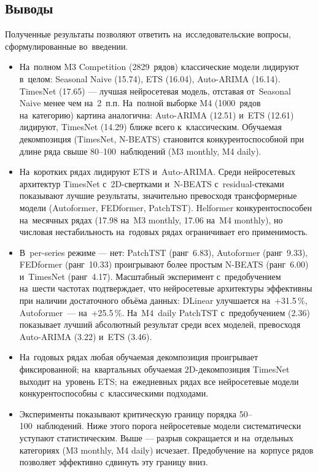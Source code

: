 \subsection{Выводы}
\label{subsec:discussion}

Полученные результаты позволяют ответить на~исследовательские
вопросы, сформулированные во~введении.

\begin{itemize}[nosep]
\item На~полном M3 Competition (2829~рядов) классические модели
лидируют в~целом: Seasonal Naive (15.74), ETS (16.04), Auto-ARIMA (16.14).
TimesNet (17.65) --- лучшая нейросетевая модель, отставая от~Seasonal Naive
менее чем на~2~п.п. На~полной выборке M4 (1000~рядов на~категорию)
картина аналогична: Auto-ARIMA (12.51) и~ETS (12.61) лидируют,
TimesNet (14.29) ближе всего к~классическим.
Обучаемая декомпозиция (TimesNet, N-BEATS) становится конкурентоспособной
при длине ряда свыше 80--100~наблюдений (M3 monthly, M4 daily).

\item На~коротких рядах лидируют ETS и~Auto-ARIMA.
Среди нейросетевых архитектур TimesNet с~2D-свертками
и~N-BEATS с~residual-стеками показывают лучшие результаты,
значительно превосходя трансформерные модели (Autoformer, FEDformer,
PatchTST). Helformer конкурентоспособен на~месячных рядах
(17.98 на~M3 monthly, 17.06 на~M4 monthly), но числовая нестабильность
на~годовых рядах ограничивает его применимость.

\item В~per-series режиме --- нет: PatchTST (ранг~6.83), Autoformer (ранг~9.33),
FEDformer (ранг~10.33) проигрывают более простым N-BEATS (ранг~6.00)
и~TimesNet (ранг~4.17). Масштабный эксперимент
с~предобучением на~шести частотах подтверждает, что нейросетевые
архитектуры эффективны при наличии достаточного объёма данных:
DLinear улучшается на~+31.5\,\%, Autoformer~--- на~+25.5\,\%.
На~M4~daily PatchTST с~предобучением (2.36) показывает лучший
абсолютный результат среди всех моделей, превосходя Auto-ARIMA (3.22)
и~ETS (3.46).

\item  На~годовых рядах любая обучаемая декомпозиция проигрывает фиксированной;
на~квартальных обучаемая 2D-декомпозиция TimesNet выходит на~уровень ETS;
на~ежедневных рядах все нейросетевые модели конкурентоспособны
с~классическими подходами.

\item Эксперименты показывают критическую границу порядка 50--100~наблюдений.
Ниже этого порога нейросетевые модели систематически уступают
статистическим. Выше --- разрыв сокращается и на~отдельных категориях
(M3 monthly, M4 daily) исчезает. Предобучение на~корпусе рядов
позволяет эффективно сдвинуть эту границу вниз.
\end{itemize}

